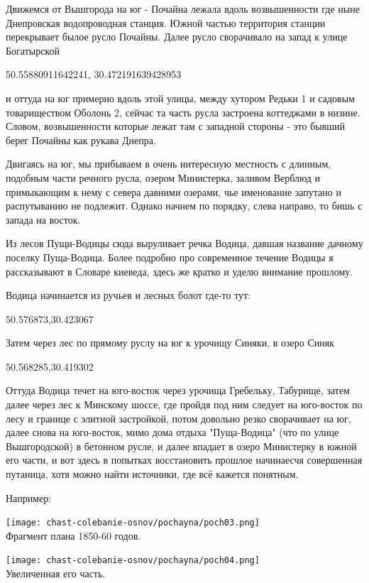 Движемся от Вышгорода на юг - Почайна лежала вдоль возвышенности где ныне Днепровская водопроводная станция. Южной частью территория станции перекрывает былое русло Почайны. Далее русло сворачивало на запад к улице Богатырской

50.55880911642241, 30.472191639428953

и оттуда на юг примерно вдоль этой улицы, между хутором Редьки 1 и садовым товариществом Оболонь 2, сейчас та часть русла застроена коттеджами в низине. Словом, возвышенности которые лежат там с западной стороны - это бывший берег Почайны как рукава Днепра.

Двигаясь на юг, мы прибываем в очень интересную местность с длинным, подобным части речного русла, озером Министерка, заливом Верблюд и примыкающим к нему с севера давними озерами, чье именование запутано и распутыванию не подлежит. Однако начнем по порядку, слева направо, то бишь с запада на восток.

Из лесов Пущи-Водицы сюда выруливает речка Водица, давшая название дачному поселку Пуща-Водица. Более подробно про современное течение Водицы я рассказывают в Словаре киеведа, здесь же кратко и уделю внимание прошлому.

Водица начинается из ручьев и лесных болот где-то тут:

50.576873,30.423067

Затем через лес по прямому руслу на юг к урочищу Синяки, в озеро Синяк

50.568285,30.419302

Оттуда Водица течет на юго-восток через урочища Гребельку, Табурище, затем далее через лес к Минскому шоссе, где пройдя под ним следует на юго-восток по лесу и границе с элитной застройкой, потом довольно резко сворачивает на юг, далее снова на юго-восток, мимо дома отдыха "Пуща-Водица" (что по улице Вышгородской) в бетонном русле, и далее впадает в озеро Министерку в южной его части, и вот здесь в попытках восстановить прошлое начинаесчя совершенная путаница, хотя можно найти источники, где всё кажется понятным.

Например:

\begin{center}
\texttt{[image: chast-colebanie-osnov/pochayna/poch03.png]}\\

Фрагмент плана 1850-60 годов.
\end{center}

\begin{center}
\texttt{[image: chast-colebanie-osnov/pochayna/poch04.png]}\\

Увеличенная его часть.
\end{center}

